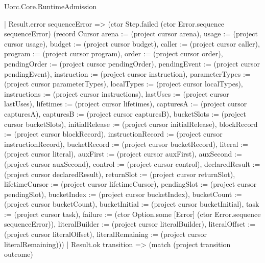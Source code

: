 \begin{lexlean}{Uorc.Core.RuntimeAdmission}
\begin{semanticmodule}
{      | Result.error sequenceError => (ctor Step.failed (ctor Error.sequence sequenceError) (record Cursor {arena := (project cursor arena), usage := (project cursor usage), budget := (project cursor budget), caller := (project cursor caller), program := (project cursor program), order := (project cursor order), pendingOrder := (project cursor pendingOrder), pendingEvent := (project cursor pendingEvent), instruction := (project cursor instruction), parameterTypes := (project cursor parameterTypes), localTypes := (project cursor localTypes), instructions := (project cursor instructions), lastUses := (project cursor lastUses), lifetimes := (project cursor lifetimes), capturesA := (project cursor capturesA), capturesB := (project cursor capturesB), bucketSlots := (project cursor bucketSlots), initialRelease := (project cursor initialRelease), blockRecord := (project cursor blockRecord), instructionRecord := (project cursor instructionRecord), bucketRecord := (project cursor bucketRecord), literal := (project cursor literal), auxFirst := (project cursor auxFirst), auxSecond := (project cursor auxSecond), control := (project cursor control), declaredResult := (project cursor declaredResult), returnSlot := (project cursor returnSlot), lifetimeCursor := (project cursor lifetimeCursor), pendingSlot := (project cursor pendingSlot), bucketIndex := (project cursor bucketIndex), bucketCount := (project cursor bucketCount), bucketInitial := (project cursor bucketInitial), task := (project cursor task), failure := (ctor Option.some [Error] (ctor Error.sequence sequenceError)), literalBuilder := (project cursor literalBuilder), literalOffset := (project cursor literalOffset), literalRemaining := (project cursor literalRemaining)}))
      | Result.ok transition => (match (project transition outcome)
}
\end{semanticmodule}
\end{lexlean}
